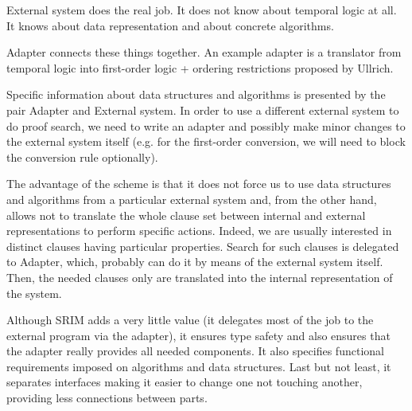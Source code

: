 \documentclass[a4paper]{article}
\begin{document}
External system does the real job. It does not know about temporal 
logic at all. It knows about data representation and about concrete algorithms.

Adapter connects these things together. An example adapter is a translator
from temporal logic into first-order logic + ordering restrictions 
proposed by Ullrich.

Specific information about data structures and algorithms is presented by the
pair Adapter and External system.  In order to use a different external system
to do proof search, we need to write an adapter and possibly make minor changes
to the external system itself (e.g. for the first-order conversion, we
will need to block the conversion rule optionally).

The advantage of the scheme is that it does not force us to use data structures
and algorithms from a particular external system and, from the other hand,
allows not to translate the whole clause set between internal and external
representations to perform specific actions.  Indeed, we are usually interested
in distinct clauses having particular properties. Search for such clauses is
delegated to Adapter, which, probably can do it by means of the external system
itself. Then, the needed clauses only are translated into the internal
representation of the system. 

Although SRIM adds a very little value (it delegates most of the job to the 
external program via the adapter), it ensures type safety and also ensures that
the adapter really provides all needed components. It also specifies functional
requirements imposed on algorithms and data structures. Last but not least, it
separates interfaces making it easier to change one not touching another, 
providing less connections between parts. 
\end{document}

